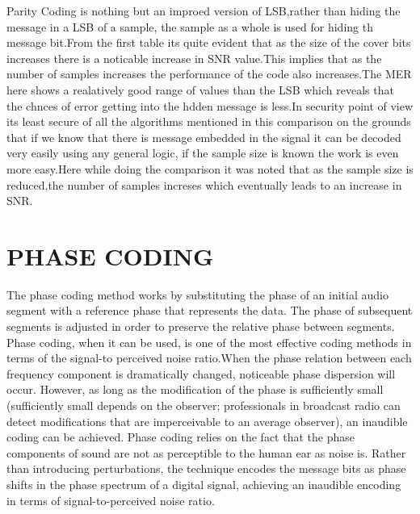 \documentclass[a4paper, 12pt, notitlepage]{report}
\begin{document}
Parity Coding is nothing but an improed version of LSB,rather than hiding the message in a LSB of a sample, the sample as a whole is used for hiding th message bit.From the first table its quite evident that as the size of the cover bits increases there is a noticable increase in SNR value.This implies that as the number of samples increases the performance of the code also increases.The MER here shows a realatively good range of values than the LSB which reveals that the chnces of error getting into the hdden message is less.In security point of view its least secure of all the algorithms mentioned in this comparison on the grounds that if we know that there is message embedded in the signal it can be decoded very easily using any general logic, if the sample size is known the work is even more easy.Here while doing the comparison it was noted that as the sample size is reduced,the number of samples increses which eventually leads to an increase in SNR.\\

\chapter{PHASE CODING}

The phase coding method works by substituting the phase of an initial audio segment with a reference phase that represents the data. The phase of subsequent segments is adjusted in order to preserve the relative phase between segments. Phase coding, when it can be used, is one of the most effective coding methods in terms of the signal-to perceived noise ratio.When the phase relation between each frequency component is dramatically changed, noticeable phase dispersion will occur. However, as long as the modification of the phase is sufficiently small (sufficiently small depends on the observer; professionals in broadcast radio can detect modifications that are imperceivable to an average observer), an inaudible coding can be achieved. Phase coding relies on the fact that the phase components of sound are not as perceptible to the human ear as noise is. Rather than introducing perturbations, the technique encodes the message bits as phase shifts in the phase spectrum of a digital signal, achieving an inaudible encoding in terms of signal-to-perceived noise ratio.\\
\end{document}

